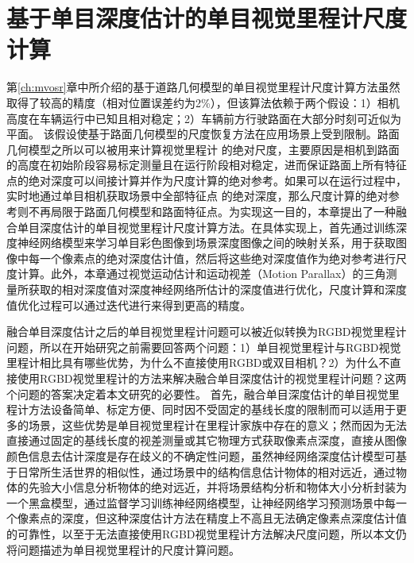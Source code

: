 \chapter{基于单目深度估计的单目视觉里程计尺度计算}
\label{ch:deepsr}

第\ref{ch:mvosr}章中所介绍的基于道路几何模型的单目视觉里程计尺度计算方法虽然取得了较高的精度（相对位置误差约为2\%），但该算法依赖于两个假设：1）相机高度在车辆运行中已知且相对稳定；2）车辆前方行驶路面在大部分时刻可近似为平面。
该假设使基于路面几何模型的尺度恢复方法在应用场景上受到限制。路面几何模型之所以可以被用来计算视觉里程计
的绝对尺度，主要原因是相机到路面的高度在初始阶段容易标定测量且在运行阶段相对稳定，进而保证路面上所有特征点的绝对深度可以间接计算并作为尺度计算的绝对参考。如果可以在运行过程中，实时地通过单目相机获取场景中全部特征点
的绝对深度，那么尺度计算的绝对参考则不再局限于路面几何模型和路面特征点。为实现这一目的，本章提出了一种融合单目深度估计的单目视觉里程计尺度计算方法。在具体实现上，首先通过训练深度神经网络模型来学习单目彩色图像到场景深度图像之间的映射关系，用于获取图像中每一个像素点的绝对深度估计值，然后将这些绝对深度值作为绝对参考进行尺度计算。此外，本章通过视觉运动估计和运动视差（Motion Parallax）的三角测量所获取的相对深度值对深度神经网络所估计的深度值进行优化，尺度计算和深度值优化过程可以通过迭代进行来得到更高的精度。

融合单目深度估计之后的单目视觉里程计问题可以被近似转换为RGBD视觉里程计问题，所以在开始研究之前需要回答两个问题：1）单目视觉里程计与RGBD视觉里程计相比具有哪些优势，为什么不直接使用RGBD或双目相机？2）为什么不直接使用RGBD视觉里程计的方法来解决融合单目深度估计的视觉里程计问题？这两个问题的答案决定着本文研究的必要性。
首先，融合单目深度估计的单目视觉里程计方法设备简单、标定方便、同时因不受固定的基线长度的限制而可以适用于更多的场景，这些优势是单目视觉里程计在里程计家族中存在的意义；然而因为无法直接通过固定的基线长度的视差测量或其它物理方式获取像素点深度，直接从图像颜色信息去估计深度是存在歧义的不确定性问题，虽然神经网络深度估计模型可基于日常所生活世界的相似性，通过场景中的结构信息估计物体的相对远近，通过物体的先验大小信息分析物体的绝对远近，并将场景结构分析和物体大小分析封装为
一个黑盒模型，通过监督学习训练神经网络模型，让神经网络学习预测场景中每一个像素点的深度，但这种深度估计方法在精度上不高且无法确定像素点深度估计值的可靠性，以至于无法直接使用RGBD视觉里程计方法解决尺度问题，所以本文仍将问题描述为单目视觉里程计的尺度计算问题。

